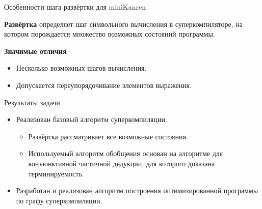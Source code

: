 \documentclass[xcolor=table]{beamer}
\begin{document}
\begin{frame}{Особенности шага развёртки для miniKanren}
\begin{block}{}
{\bf Развёртка} определяет шаг символьного вычисления в суперкомпиляторе,
на котором порождается множество возможных состояний программы.
\end{block}
\vspace{0.5cm}
\begin{block}
{\bf Значимые отличия}
\begin{itemize}
\item Несколько возможных шагов вычисления.
\item Допускается переупорядочивание элементов выражения.
\end{itemize}
\end{block}
\end{frame}

\begin{frame}{Результаты задачи}
\begin{itemize}
\item Реализован базовый алгоритм суперкомпиляции.
\begin{itemize}
\item Развёртка рассматривает все возможные состояния.
\item Используемый алгоритм обобщения основан на алгоритме для конъюнктивной частичной дедукции,
      для которого доказана терминируемость.
\end{itemize}
\item Разработан и реализован алгоритм построения оптимизированной программы по графу суперкомпиляции.
\end{itemize}
\end{frame}
\end{document}
